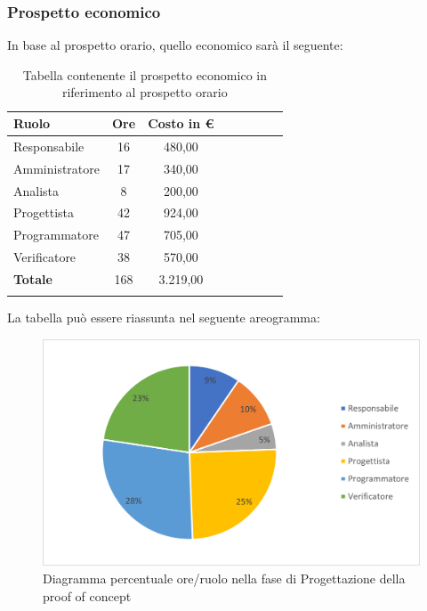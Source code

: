 			\subsubsection{Prospetto economico}
			In base al prospetto orario, quello economico sarà il seguente: 
			
			\begin{longtable}{|l|c|c|c|c|c|c|c|}
				\hline
				\rowcolor{lighter-grayer}
				\textbf{Ruolo} & \textbf{Ore} & \textbf{Costo in €} \\
				\hline
				\endfirsthead
				
				\hline
				Responsabile & 16 & 480,00\\
				\hline
				\hline
				Amministratore & 17 & 340,00\\
				\hline
				\hline
				Analista & 8 & 200,00\\
				\hline
				\hline
				Progettista & 42 & 924,00\\
				\hline
				\hline
				Programmatore & 47 & 705,00\\
				\hline
				\hline
				Verificatore & 38 & 570,00\\
				\hline
				\hline
				\textbf{Totale} & 168 & 3.219,00\\
				\hline
				\rowcolor{white}
				\caption{Tabella contenente il prospetto economico in riferimento al prospetto orario}
			\end{longtable}
			\pagebreak
		
			La tabella può essere riassunta nel seguente areogramma:
			\begin{figure}[H]
				\centering
				\includegraphics[width=0.8\linewidth]{res/images/preventivo/4-2.png}
				\caption{Diagramma percentuale ore/ruolo nella fase di Progettazione della proof of concept}
				\label{fig:diagramma costi ruolo fase progettazione della proof of concept}
            \end{figure}

